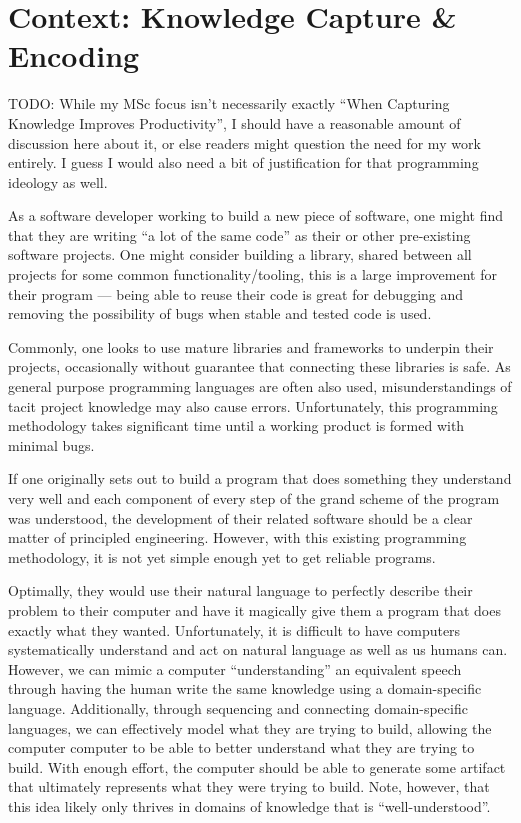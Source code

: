 \section{Context: Knowledge Capture \& Encoding}

TODO: While my MSc focus isn't necessarily exactly ``When Capturing Knowledge
Improves Productivity'', I should have a reasonable amount of discussion here
about it, or else readers might question the need for my work entirely. I guess
I would also need a bit of justification for that programming ideology as well.

As a software developer working to build a new piece of software, one might
find that they are writing ``a lot of the same code'' as their or other
pre-existing software projects. One might consider building a library, shared
between all projects for some common functionality/tooling, this is a large
improvement for their program --- being able to reuse their code is great for
debugging and removing the possibility of bugs when stable and tested code is
used.


Commonly, one looks to use mature libraries and frameworks to underpin their
projects, occasionally without guarantee that connecting these libraries is safe.
As general purpose programming languages are often also used, misunderstandings
of tacit project knowledge may also cause errors. Unfortunately, this
programming methodology takes significant time until a working product is formed
with minimal bugs.

If one originally sets out to build a program that does something they
understand very well and each component of every step of the grand scheme of the
program was understood, the development of their related software should be a
clear matter of principled engineering. However, with this existing programming
methodology, it is not yet simple enough yet to get reliable programs.

Optimally, they would use their natural language to perfectly describe their
problem to their computer and have it magically give them a program that does
exactly what they wanted. Unfortunately, it is difficult to have computers
systematically understand and act on natural language as well as us humans can.
However, we can mimic a computer ``understanding'' an equivalent speech through
having the human write the same knowledge using a domain-specific language.
Additionally, through sequencing and connecting domain-specific languages, we
can effectively model what they are trying to build, allowing the computer
computer to be able to better understand what they are trying to build. With
enough effort, the computer should be able to generate some artifact that
ultimately represents what they were trying to build. Note, however, that this
idea likely only thrives in domains of knowledge that is
``well\hyp{}understood''.

